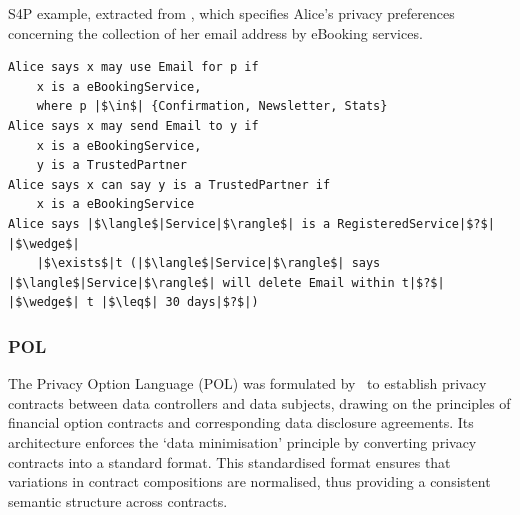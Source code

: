 \begin{listing}
\caption[S4P instantiation.]{S4P example, extracted from \cite{becker_framework_2009}, which specifies Alice's privacy preferences concerning the collection of her email address by eBooking services.}
\label{list:s4p_example}
\begin{verbatim}
Alice says x may use Email for p if
    x is a eBookingService,
    where p |$\in$| {Confirmation, Newsletter, Stats}
Alice says x may send Email to y if
    x is a eBookingService,
    y is a TrustedPartner
Alice says x can say y is a TrustedPartner if
    x is a eBookingService
Alice says |$\langle$|Service|$\rangle$| is a RegisteredService|$?$| |$\wedge$|
    |$\exists$|t (|$\langle$|Service|$\rangle$| says |$\langle$|Service|$\rangle$| will delete Email within t|$?$| |$\wedge$| t |$\leq$| 30 days|$?$|)
\end{verbatim}
\end{listing}

\subsubsection{POL}
\label{sec:pol}

The Privacy Option Language (POL) was formulated by~\cite{berthold_privacy_2013} to establish privacy contracts between data controllers and data subjects, drawing on the principles of financial option contracts and corresponding data disclosure agreements.
Its architecture enforces the `data minimisation' principle by converting privacy contracts into a standard format.
This standardised format ensures that variations in contract compositions are normalised, thus providing a consistent semantic structure across contracts.

